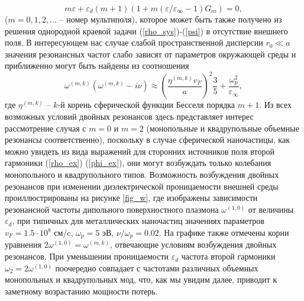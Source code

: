 \documentclass[12pt, a4paper]{article}
\def \eps {\varepsilon}
\def \w {\omega}
\begin{document}
\begin{equation}
	\label{freq_eq} 	
m \eps + \eps_d(m+1)(1 + m (\eps/\eps_\infty - 1) G_m) = 0,	
\end{equation}
($m=0,1,2,...$ – номер мультиполя), которое может быть также получено из решения однородной краевой задачи (\ref{rho_sys})-(\ref{psi}) в отсутствие внешнего поля. В интересующем нас случае слабой пространственной дисперсии $r_0 \ll a$ значения резонансных частот слабо зависят от параметров окружающей среды и приближенно могут быть найдены из соотношения 
\begin{equation} 
 \w^{(m,k)}(\w^{(m,k)} - i \nu) \approx \left(\frac{\eta^{(m,k)} v_F }{a}\right)^2 \frac{3}{5} + \frac{\w_p^2}{\eps_\infty},
\end{equation}
где $\eta^{(m,k)}$ -- $k$-й корень сферической функции Бесселя порядка $m+1$.	Из всех возможных условий двойных резонансов здесь представляет интерес рассмотрение случая с $m=0$ и $m=2$ (монопольные и квадрупольные объемные резонансы соответственно), поскольку в случае сферической наночастицы, как можно увидеть из вида выражений для сторонних источников поля второй гармоники (\ref{rho_ex}) (\ref{phi_ex}), они  могут возбуждать только колебания монопольного и квадрупольного типов.
Возможность возбуждения двойных резонансов при изменении диэлектрической проницаемости внешней среды проиллюстрированы на рисунке \ref{fig_w}, где изображены зависимости резонансной частоты дипольного поверхностного плазмона $\w^{(1,0)}$ от величины $\eps_d$, при типичных для металлических наночастиц значениях параметров $v_F = 1.5 \cdot 10^8$ см/c, $\w_p = 5$ эВ, $\nu / \w_p = 0.02$. 
На графике также отмечены корни уравнения $2\w^{(1,0)}=\w^{(m,k)}$, отвечающие условиям возбуждения двойных резонансов.
При уменьшении проницаемости $\eps_d$ частота второй гармоники $\w_2=2\w^{(1,0)}$ поочередно совпадает с частотами различных объемных монопольных и квадрупольных мод, что, как мы увидим далее, приводит к заметному возрастанию мощности потерь. 
\end{document}
